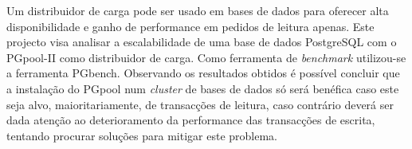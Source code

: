 Um distribuidor de carga pode ser usado em bases de dados para oferecer alta disponibilidade e ganho de performance em pedidos de leitura apenas. Este projecto visa analisar a escalabilidade de uma base de dados PostgreSQL com o PGpool-II como distribuidor de carga. Como ferramenta de \textit{benchmark} utilizou-se a ferramenta PGbench. Observando os resultados obtidos é possível concluir que a instalação do PGpool num \textit{cluster} de bases de dados só será benéfica caso este seja alvo, maioritariamente, de transacções de leitura, caso contrário deverá ser dada atenção ao deterioramento da performance das transacções de escrita, tentando procurar soluções para mitigar este problema.

